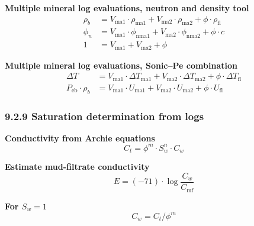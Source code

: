 \textbf{Multiple mineral log evaluations, neutron and density tool}
% 
% 
\begin{align}
    \rho_b & = V_\mathrm{ma1}\cdot\rho_\mathrm{ma1} + V_\mathrm{ma2}\cdot\rho_\mathrm{ma2} + \phi\cdot\rho_\mathrm{fl}\tag{9A.9} \\
    \phi_n & = V_\mathrm{ma1}\cdot\phi_\mathrm{nma1} + V_\mathrm{ma2}\cdot\phi_\mathrm{nma2} + \phi\cdot c\tag{9A.10}            \\
    1      & = V_\mathrm{ma1} + V_\mathrm{ma2} + \phi\tag{9A.11}
\end{align}

\textbf{Multiple mineral log evaluations, Sonic--Pe combination}
\begin{align}
    \Delta T                 & = V_\mathrm{ma1}\cdot\Delta T_\mathrm{ma1} + V_\mathrm{ma2}\cdot\Delta T_\mathrm{ma2} + \phi\cdot\Delta T_\mathrm{fl}\tag{9A.12} \\
    P_\mathrm{eb}\cdot\rho_b & = V_\mathrm{ma1}\cdot U_\mathrm{ma1} + V_\mathrm{ma2}\cdot U_\mathrm{ma2} + \phi\cdot U_\mathrm{fl} \tag{9A.13}
\end{align}

\subsubsection{9.2.9 Saturation determination from logs}
\textbf{Conductivity from Archie equations}
\begin{equation*}
    C_t = \phi^m\cdot S_w^n\cdot C_w\tag{9A.14}
\end{equation*}

\textbf{Estimate mud-filtrate conductivity}
\begin{equation*}
    E = (-71)\cdot\log\frac{C_w}{C_\mathrm{mf}}\tag{9A.15}
\end{equation*}

\textbf{For $S_w=1$}
\begin{equation*}
    C_w = C_t / \phi^m\tag{9A.16}
\end{equation*}


